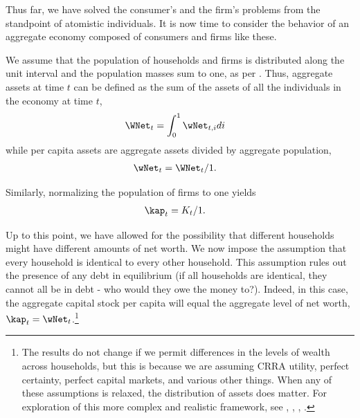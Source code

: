 \documentclass{handout}
\begin{document}
Thus far, we have solved the consumer's and the firm's problems 
from the standpoint of atomistic individuals.  It is now time to 
consider the behavior of an aggregate economy composed of consumers
and firms like these.

We assume that the population of households and firms is distributed
along the unit interval and the population masses sum to one, 
as per .  Thus, aggregate assets at time $t$
can be defined as the sum of the assets of all the individuals in the
economy at time $t$,
\begin{equation}\begin{gathered}\begin{aligned}
  \WNet_{t} & =  \int_{0}^{1} \wNet_{t,i}  di
\end{aligned}\end{gathered}\end{equation}
while per capita assets are aggregate assets divided by aggregate population,
\begin{equation}\begin{gathered}\begin{aligned}
  \wNet_{t} & =  \WNet_{t}/1.
\end{aligned}\end{gathered}\end{equation}

Similarly, normalizing the population of firms to one yields
\begin{equation}\begin{gathered}\begin{aligned}
  \kap_{t} & =  K_{t}/1.
\end{aligned}\end{gathered}\end{equation}

Up to this point, we have allowed for the possibility that different
households might have different amounts of net worth.  We now impose
the assumption that every household is identical to every other
household.  This assumption rules out the presence of any debt in
equilibrium (if all households are identical, they cannot all be in
debt - who would they owe the money to?).  Indeed, in this case, the
aggregate capital stock per capita will equal the aggregate level of
net worth, $\kap_{t}=\wNet_{t}$.\footnote{The results do not change if we
  permit differences in the levels of wealth across households, but
  this is because we are assuming CRRA utility, perfect certainty,
  perfect capital markets, and various other things.  When any of
  these assumptions is relaxed, the distribution of assets does
  matter.  For exploration of this more complex and realistic
  framework, see \cite{carroll:brookings}, \cite{aiyagari:ge},
  \cite{ksHetero}, \cite{carrollRequiem}.  }
\end{document}

